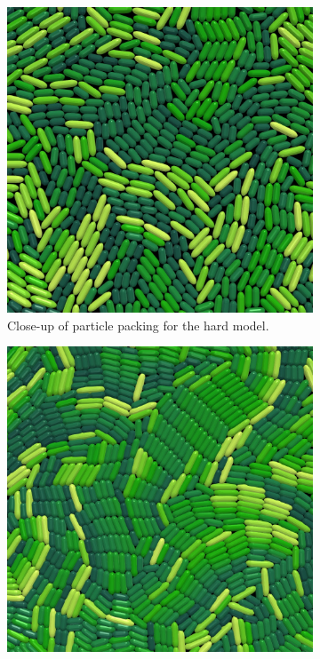 \documentclass[conference]{IEEEtran}
\begin{document}
\begin{figure}[H]
    \centering
    \begin{subfigure}[b]{0.49\columnwidth}
        \centering
        \includegraphics[width=\linewidth]{figures/comparisons/packing_hard.jpeg}
        \caption{Close-up of particle packing for the hard model.}
        \label{fig:packing_hard}
    \end{subfigure}
    \begin{subfigure}[b]{0.49\columnwidth}
        \centering
        \includegraphics[width=\linewidth]{figures/comparisons/packing_soft.jpeg}

\end{subfigure}
\end{figure}
\end{document}
